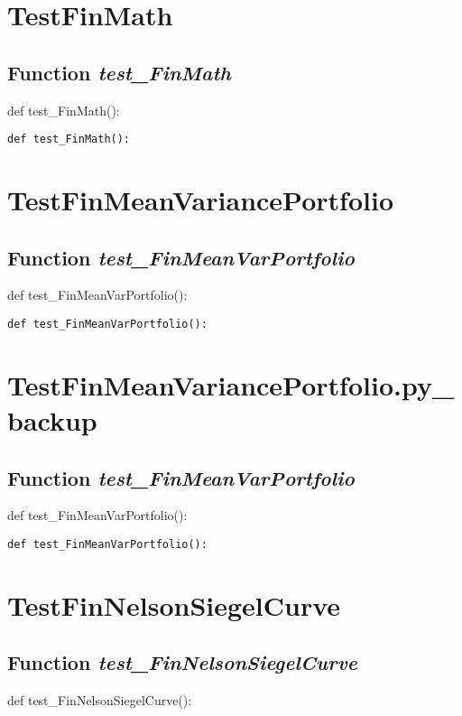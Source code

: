 \documentclass[twoside,11pt]{book}
\begin{document}
\newpage
\section{TestFinMath}

\subsection{Function {\it test\_FinMath}}
def test\_FinMath():

\begin{lstlisting}
def test_FinMath():
\end{lstlisting}


\newpage
\section{TestFinMeanVariancePortfolio}

\subsection{Function {\it test\_FinMeanVarPortfolio}}
def test\_FinMeanVarPortfolio():

\begin{lstlisting}
def test_FinMeanVarPortfolio():
\end{lstlisting}


\newpage
\section{TestFinMeanVariancePortfolio.py_backup}

\subsection{Function {\it test\_FinMeanVarPortfolio}}
def test\_FinMeanVarPortfolio():

\begin{lstlisting}
def test_FinMeanVarPortfolio():
\end{lstlisting}


\newpage
\section{TestFinNelsonSiegelCurve}

\subsection{Function {\it test\_FinNelsonSiegelCurve}}
def test\_FinNelsonSiegelCurve():
\end{document}
